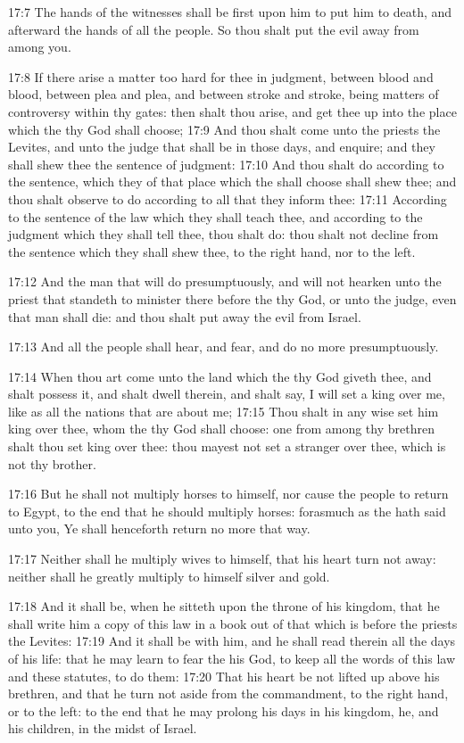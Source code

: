 17:7 The hands of the witnesses shall be first upon him to put him to
death, and afterward the hands of all the people. So thou shalt put
the evil away from among you.

17:8 If there arise a matter too hard for thee in judgment, between
blood and blood, between plea and plea, and between stroke and stroke,
being matters of controversy within thy gates: then shalt thou arise,
and get thee up into the place which the \LORD thy God shall choose;
17:9 And thou shalt come unto the priests the Levites, and unto the
judge that shall be in those days, and enquire; and they shall shew
thee the sentence of judgment: 17:10 And thou shalt do according to
the sentence, which they of that place which the \LORD shall choose
shall shew thee; and thou shalt observe to do according to all that
they inform thee: 17:11 According to the sentence of the law which
they shall teach thee, and according to the judgment which they shall
tell thee, thou shalt do: thou shalt not decline from the sentence
which they shall shew thee, to the right hand, nor to the left.

17:12 And the man that will do presumptuously, and will not hearken
unto the priest that standeth to minister there before the \LORD thy
God, or unto the judge, even that man shall die: and thou shalt put
away the evil from Israel.

17:13 And all the people shall hear, and fear, and do no more
presumptuously.

17:14 When thou art come unto the land which the \LORD thy God giveth
thee, and shalt possess it, and shalt dwell therein, and shalt say, I
will set a king over me, like as all the nations that are about me;
17:15 Thou shalt in any wise set him king over thee, whom the \LORD thy
God shall choose: one from among thy brethren shalt thou set king over
thee: thou mayest not set a stranger over thee, which is not thy
brother.

17:16 But he shall not multiply horses to himself, nor cause the
people to return to Egypt, to the end that he should multiply horses:
forasmuch as the \LORD hath said unto you, Ye shall henceforth return
no more that way.

17:17 Neither shall he multiply wives to himself, that his heart turn
not away: neither shall he greatly multiply to himself silver and
gold.

17:18 And it shall be, when he sitteth upon the throne of his kingdom,
that he shall write him a copy of this law in a book out of that which
is before the priests the Levites: 17:19 And it shall be with him, and
he shall read therein all the days of his life: that he may learn to
fear the \LORD his God, to keep all the words of this law and these
statutes, to do them: 17:20 That his heart be not lifted up above his
brethren, and that he turn not aside from the commandment, to the
right hand, or to the left: to the end that he may prolong his days in
his kingdom, he, and his children, in the midst of Israel.

